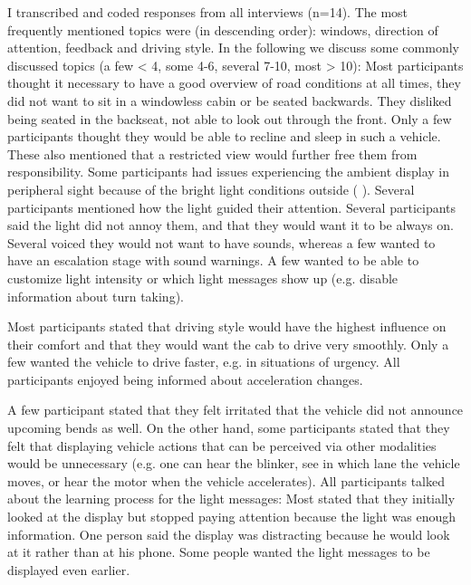 I transcribed and coded responses from all interviews (n=14). The most frequently mentioned topics were (in descending order): windows, direction of attention, feedback and driving style. In the following we discuss some commonly discussed topics (a few < 4, some 4-6, several 7-10, most > 10): Most participants thought it necessary to have a good overview of road conditions at all times, they did not want to sit in a windowless cabin or be seated backwards. They disliked being seated in the backseat, not able to look out through the front. Only a few participants thought they would be able to recline and sleep in such a vehicle. These also mentioned that a restricted view would further free them from responsibility. Some participants had issues experiencing the ambient display in peripheral sight because of the bright light conditions outside ( ). Several participants mentioned how the light guided their attention. Several participants said the light did not annoy them, and that they would want it to be always on. Several voiced they would not want to have sounds, whereas a few wanted to have an escalation stage with sound warnings. A few wanted to be able to customize light intensity or which light messages show up (e.g. disable information about turn taking). %
\begin{quotation}\end{quotation}
Most participants stated that driving style would have the highest influence on their comfort and that they would want the cab to drive very smoothly. Only a few wanted the vehicle to drive faster, e.g. in situations of urgency. All participants enjoyed being informed about acceleration changes.
\begin{quotation}\end{quotation}
 A few participant stated that they felt irritated that the vehicle did not announce upcoming bends as well. On the other hand, some participants stated that they felt that displaying vehicle actions that can be perceived via other modalities would be unnecessary (e.g. one can hear the blinker, see in which lane the vehicle moves, or hear the motor when the vehicle accelerates). All participants talked about the learning process for the light messages: Most stated that they initially looked at the display but stopped paying attention because the light was enough information. One person said the display was distracting because he would look at it rather than at his phone. Some people wanted the light messages to be displayed even earlier. \begin{quotation}\end{quotation}
